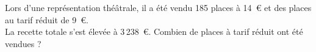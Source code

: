 Lors d'une représentation théâtrale, il a été vendu 185 places à
14~\textgreek{\euro} et des places au tarif réduit de
9~\textgreek{\euro}.\\La recette totale s'est élevée à
3\,238~\textgreek{\euro}. Combien de places à tarif réduit ont été
vendues ?